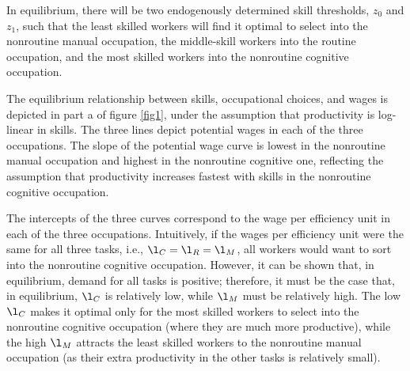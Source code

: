 \documentclass[12pt]{article}
\theoremstyle{definition}
\begin{document}
In equilibrium, there will be two endogenously determined skill thresholds, $z_0$ and $z_1$, such that the least skilled workers will find it optimal to select into the nonroutine manual occupation, the middle-skill workers into the routine occupation, and the most skilled workers into the nonroutine cognitive occupation.

The equilibrium relationship between skills, occupational choices, and wages is depicted in part a of figure \ref{fig1}, under the assumption that productivity is log-linear in skills. The three lines depict potential wages in each of the three occupations. The slope of the potential wage curve is lowest in the nonroutine manual occupation and highest in the nonroutine cognitive one, reflecting the assumption that productivity increases fastest with skills in the nonroutine cognitive occupation.

The intercepts of the three curves correspond to the wage per efficiency unit in each of the three occupations. Intuitively, if the wages per efficiency unit were the same for all three tasks, i.e., $\l_C = \l_R = \l_M$, all workers would want to sort into the nonroutine cognitive occupation. However, it can be shown that, in equilibrium, demand for all tasks is positive; therefore, it must be the case that, in equilibrium, $\l_C$ is relatively low, while $\l_M$ must be relatively high. The low $\l_C$ makes it optimal only for the most skilled workers to select into the nonroutine cognitive occupation (where they are much more productive), while the high $\l_M$ attracts the least skilled workers to the nonroutine manual occupation (as their extra productivity in the other tasks is relatively small).
\end{document}
